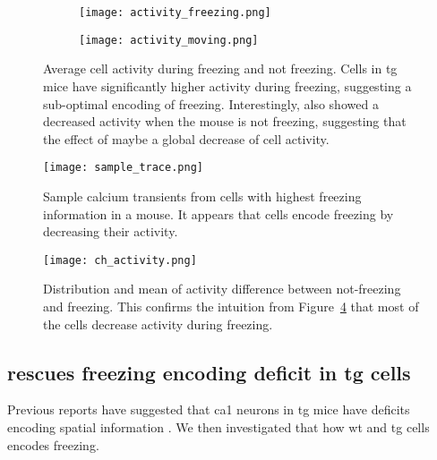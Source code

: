 \begin{figure}[h]
    \begin{subfigure}[h]{\textwidth}
        \texttt{[image: activity\_freezing.png]}
        \caption{\label{f.ad.actf}}
    \end{subfigure}
    \begin{subfigure}[h]{\textwidth}
        \texttt{[image: activity\_moving.png]}
        \caption{\label{f.ad.actnf}}
    \end{subfigure}
    \caption{Average cell activity during  freezing and  not freezing. Cells in \gls{tg} mice have significantly higher activity during freezing, suggesting a sub-optimal encoding of freezing. Interestingly, \tglu also showed a decreased activity when the mouse is not freezing, suggesting that the effect of \tglu maybe a global decrease of cell activity. \label{f.ad.activity_freezing}}
\end{figure}
\begin{figure}[h]
    \texttt{[image: sample\_trace.png]}
    \caption{Sample calcium transients from cells with highest freezing information in a mouse. It appears that cells encode freezing by decreasing their activity. \label{f.ad.sample_trace}}
\end{figure}
\begin{figure}[h]
    \texttt{[image: ch\_activity.png]}
    \caption{Distribution and mean of activity difference between not-freezing and freezing. This confirms the intuition from Figure~\ref{f.ad.sample_trace} that most of the cells decrease activity during freezing. \label{f.ad.ch_activity}}
\end{figure}

\subsection{\tglu rescues freezing encoding deficit in \gls{tg} cells}

Previous reports have suggested that \gls{ca1} neurons in \gls{tg} mice have deficits encoding spatial information . We then investigated that how \gls{wt} and \gls{tg} cells encodes freezing.  

